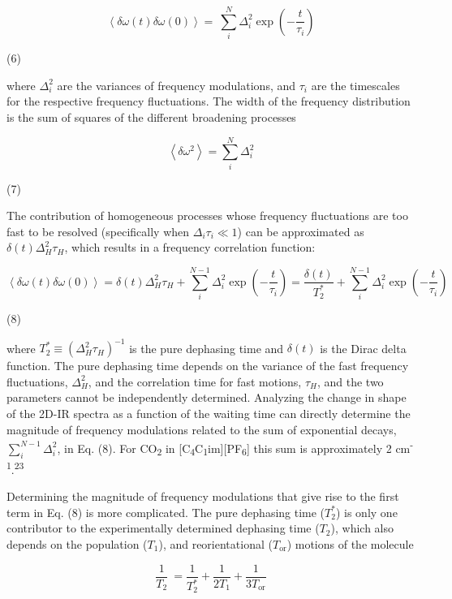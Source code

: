 \documentclass[]{article}
\begin{document}
\[\left\langle \delta\omega(t) \delta\omega(0) \right\rangle = \ \sum_{i}^{N}{\Delta_{i}^{2}\exp\left( - \frac{t}{\tau_{i}} \right)}\]

(6)

where \(\Delta_{i}^{2}\) are the variances of frequency modulations, and
\(\tau_{i}\) are the timescales for the respective frequency
fluctuations. The width of the frequency distribution is the sum of
squares of the different broadening processes

\[\left\langle \delta\omega^{2} \right\rangle = \sum_{i}^{N}\Delta_{i}^{2}\]

(7)

The contribution of homogeneous processes whose frequency fluctuations
are too fast to be resolved (specifically when
\(\Delta_{i}\tau_{i} \ll 1\)) can be approximated as
\(\delta\left( t \right)\Delta_{H}^{2}\tau_{H}\), which results in a
frequency correlation function:

\[\left\langle \delta\omega(t) \delta\omega(0) \right\rangle = \delta\left( t \right)\Delta_{H}^{2}\tau_{H} + \sum_{i}^{N - 1}{\Delta_{i}^{2}\exp\left( - \frac{t}{\tau_{i}} \right)} = \frac{\delta\left( t \right)}{T_{2}^{*}} + \sum_{i}^{N - 1}{\Delta_{i}^{2}\exp\left( - \frac{t}{\tau_{i}} \right)}\]

(8)

where \(T_{2}^{*} \equiv \left( \Delta_{H}^{2}\tau_{H} \right)^{- 1}\)
is the pure dephasing time and \(\delta\left( t \right)\) is the Dirac
delta function. The pure dephasing time depends on the variance of the
fast frequency fluctuations, \(\Delta_{H}^{2}\), and the correlation
time for fast motions, \(\tau_{H}\), and the two parameters cannot be
independently determined. Analyzing the change in shape of the 2D-IR
spectra as a function of the waiting time can directly determine the
magnitude of frequency modulations related to the sum of exponential
decays, \(\sum_{i}^{N - 1}\Delta_{i}^{2}\), in Eq. (8). For
CO\textsubscript{2} in
{[}C\textsubscript{4}C\textsubscript{1}im{]}{[}PF\textsubscript{6}{]}
this sum is approximately 2 cm\textsuperscript{-1}.\textsuperscript{23}

Determining the magnitude of frequency modulations that give rise to the
first term in Eq. (8) is more complicated. The pure dephasing time
(\(T_{2}^{*}\)) is only one contributor to the experimentally determined
dephasing time (\(T_{2}\)), which also depends on the population
(\(T_{1}\)), and reorientational (\(T_{\text{or}}\)) motions of the
molecule

\[\frac{1}{T_{2}}\  = \frac{1}{T_{2}^{*}} + \frac{1}{2T_{1}} + \frac{1}{3T_{\text{or}}}\]
\end{document}
